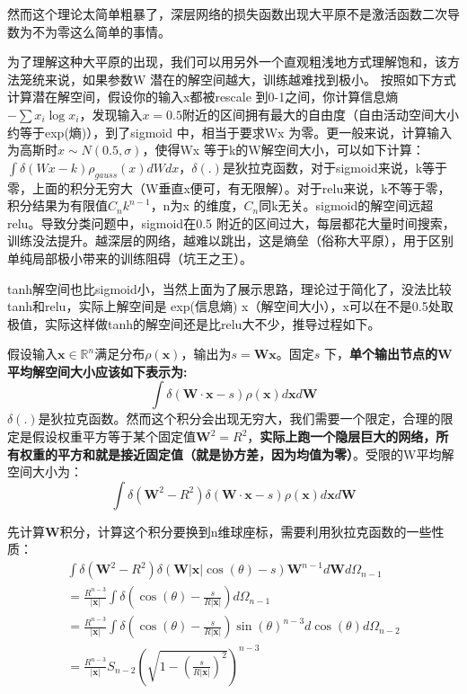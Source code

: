 \documentclass[11pt,fleqn, UTF8]{ctexbook} %
\begin{document}
然而这个理论太简单粗暴了，深层网络的损失函数出现大平原不是激活函数二次导数为不为零这么简单的事情。

为了理解这种大平原的出现，我们可以用另外一个直观粗浅地方式理解饱和，该方法笼统来说，如果参数W 潜在的解空间越大，训练越难找到极小。 按照如下方式计算潜在解空间，假设你的输入x都被rescale 到0-1之间，你计算信息熵$-\sum x_i \log x_i$，发现输入$x=0.5$附近的区间拥有最大的自由度（自由活动空间大小约等于exp(熵)），到了sigmoid 中，相当于要求Wx 为零。更一般来说，计算输入为高斯时$x \sim  N (0.5, \sigma)$，使得Wx 等于k的W解空间大小，可以如下计算：$\int \delta(Wx-k)\rho_{gauss}(x)dWdx$，$\delta(.)$是狄拉克函数，对于sigmoid来说，k等于零，上面的积分无穷大（W垂直x便可，有无限解）。对于relu来说，k不等于零，积分结果为有限值$C_n k^{n-1}$，n为x 的维度，$C_n$同k无关。sigmoid的解空间远超relu。导致分类问题中，sigmoid在0.5 附近的区间过大，每层都花大量时间搜索，训练没法提升。越深层的网络，越难以跳出，这是熵垒（俗称大平原），用于区别单纯局部极小带来的训练阻碍（坑王之王）。

tanh解空间也比sigmoid小，当然上面为了展示思路，理论过于简化了，没法比较tanh和relu，实际上解空间是 exp(信息熵) x（解空间大小），x可以在不是0.5处取极值，实际这样做tanh的解空间还是比relu大不少，推导过程如下。

假设输入$\boldsymbol{x}\in\mathbb{R}^n$满足分布$\rho(\boldsymbol{x})$，输出为$s=\boldsymbol{W}\boldsymbol{x}$。固定$s$ 下，\textbf{单个输出节点的W平均解空间大小应该如下表示为:}
\begin{equation*}
  \int \delta(\boldsymbol{W} \cdot \boldsymbol{x}-s)\rho(\boldsymbol{x})d\boldsymbol{x}d\boldsymbol{W}
\end{equation*}
$\delta(.)$是狄拉克函数。然而这个积分会出现无穷大，我们需要一个限定，合理的限定是假设权重平方等于某个固定值$\boldsymbol{W}^2=R^2$，\textbf{实际上跑一个隐层巨大的网络，所有权重的平方和就是接近固定值（就是协方差，因为均值为零）}。受限的W平均解空间大小为：
\begin{equation*}
  \int \delta(\boldsymbol{W}^2-R^2) \delta(\boldsymbol{W} \cdot \boldsymbol{x}-s)\rho(\boldsymbol{x})d\boldsymbol{x}d\boldsymbol{W}
\end{equation*}

先计算$\boldsymbol{W}$积分，计算这个积分要换到n维球座标，需要利用狄拉克函数的一些性质：
\begin{gather*}
  \int \delta(\boldsymbol{W}^2-R^2) \delta(\boldsymbol{W}|\boldsymbol{x}|\cos(\theta)-s) \boldsymbol{W}^{n-1} d\boldsymbol{W} d\Omega_{n-1} \\
  =\frac{R^{n-3}}{|\boldsymbol{x}|} \int \delta(\cos(\theta)-\frac{s}{R|\boldsymbol{x}|})d\Omega_{n-1}\\
  =\frac{R^{n-3}}{|\boldsymbol{x}|} \int \delta(\cos(\theta)-\frac{s}{R|\boldsymbol{x}|}) \sin(\theta)^{n-3} d\cos(\theta) d\Omega_{n-2}\\
  =\frac{R^{n-3}}{|\boldsymbol{x}|} S_{n-2} \left(\sqrt{1-\left(\frac{s}{R|\boldsymbol{x}|}\right)^{2}}\right)^{n-3}
\end{gather*}
\end{document}
